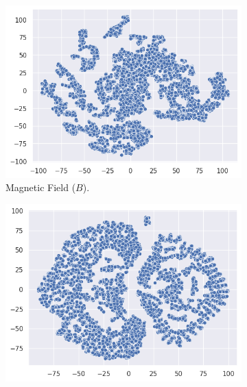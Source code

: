 \begin{figure}[h]
    \caption[t-SNE applied to the different variables]{t-SNE applied to the different variables. (a) and (b) represent the t-SNE of the magnetic field variable ($B[G]$) and the flux-tube inclination variable ($\alpha [deg]$), respectively; (c) is the t-SNE of all input variables combined.}
    \label{fig:tsne_2d}
    \begin{subfigure}[h]{0.329\textwidth}
        \centering
        \includegraphics[width=\textwidth]{figures/tsne_mag_2d.png}
        \caption{Magnetic Field ($B$).}
        \label{fig:tsne_mag_2d}
    \end{subfigure}
    \hfill
    \begin{subfigure}[h]{0.329\textwidth}
        \centering
        \includegraphics[width=\textwidth]{figures/tsne_alpha_2d.png}

\end{subfigure}
\end{figure}
